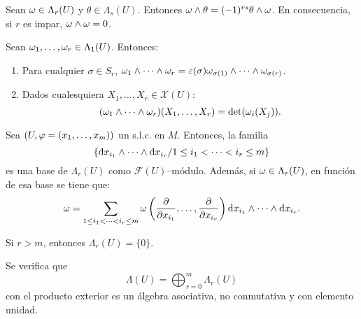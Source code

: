 \documentclass[cursovd_portada.tex]{subfiles}
\begin{document}
\begin{prop}
Sean $\omega\in\Lambda_r(U)$ y $\theta\in\Lambda_s(U)$. Entonces $\omega\wedge\theta=(-1)^{rs}\theta\wedge\omega$. En
consecuencia, si $r$ es impar, $\omega\wedge\omega=0$.
\end{prop}
\begin{prop}
Sean $\omega_1,\dots ,\omega_r\in\Lambda_1(U)$. Entonces:
\begin{enumerate}
\item Para cualquier $\sigma\in S_r$, $\omega_1\wedge\cdots\wedge\omega_r=\varepsilon(\sigma)\omega_{\sigma(1)}\wedge\cdots
\wedge\omega_{\sigma(r)}$.
\item Dados cualesquiera $X_1,\dots ,X_r\in\mathcal{X}(U)$:
$$(\omega_1\wedge\cdots\wedge\omega_r)(X_1,\dots ,X_r)={\rm det}(\omega_i(X_j)).$$
\end{enumerate}
\end{prop}
\begin{prop}
Sea $(U,\varphi=(x_1,\dots ,x_m))$ un s.l.c. en $M$. Entonces, la familia
$$\{{\rm d} x_{i_1}\wedge\cdots\wedge{\rm d} x_{i_r}/1\leq i_1<\cdots <i_r\leq m\}$$
es una base de $\Lambda_r(U)$ como $\mathcal{F}(U)$--módulo. Además, si $\omega\in\Lambda_r(U)$, en función de esa
base se tiene que:
$$\omega=\sum_{1\leq i_1 <\cdots <i_r\leq m}\omega\left(\displaystyle{\frac{\partial}{\partial x_{i_1}}},\dots
,\displaystyle{\frac{\partial}{\partial x_{i_r}}}\right){\rm d} x_{i_1}\wedge\cdots\wedge{\rm d} x_{i_r}.$$
\end{prop}
\begin{coro}
Si $r>m$, entonces $\Lambda_r(U)=\{0\}$.
\end{coro}
\begin{prop}
Se verifica que
$$\Lambda(U)=\bigoplus_{r=0}^m\Lambda_r(U)$$
con el producto exterior es un álgebra asociativa, no conmutativa y con elemento unidad.
\end{prop}
\end{document}
